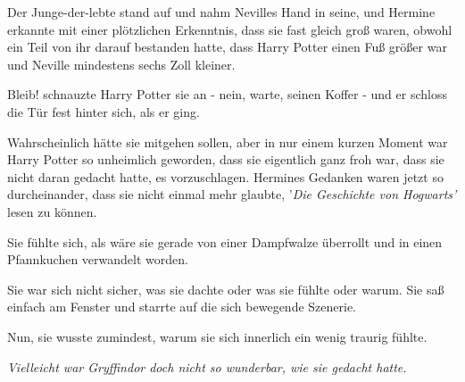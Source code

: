 Der Junge-der-lebte stand auf und nahm Nevilles Hand in seine, und Hermine
erkannte mit einer plötzlichen Erkenntnis, dass sie fast gleich groß waren,
obwohl ein Teil von ihr darauf bestanden hatte, dass Harry Potter einen Fuß
größer war und Neville mindestens sechs Zoll kleiner.

\glqq Bleib!\grqq{} schnauzte Harry Potter sie an - nein, warte, seinen Koffer -
und er schloss die Tür fest hinter sich, als er ging.

Wahrscheinlich hätte sie mitgehen sollen, aber in nur einem kurzen Moment war
Harry Potter so unheimlich geworden, dass sie eigentlich ganz froh war, dass sie
nicht daran gedacht hatte, es vorzuschlagen. Hermines Gedanken waren jetzt so
durcheinander, dass sie nicht einmal mehr glaubte, '\emph{Die Geschichte von
Hogwarts' }lesen zu können.

Sie fühlte sich, als wäre sie gerade von einer Dampfwalze überrollt und in einen
Pfannkuchen verwandelt worden.

Sie war sich nicht sicher, was sie dachte oder was sie fühlte oder warum. Sie
saß einfach am Fenster und starrte auf die sich bewegende Szenerie.

Nun, sie wusste zumindest, warum sie sich innerlich ein wenig traurig fühlte.

\emph{Vielleicht war Gryffindor doch nicht so wunderbar, wie sie gedacht hatte.
}